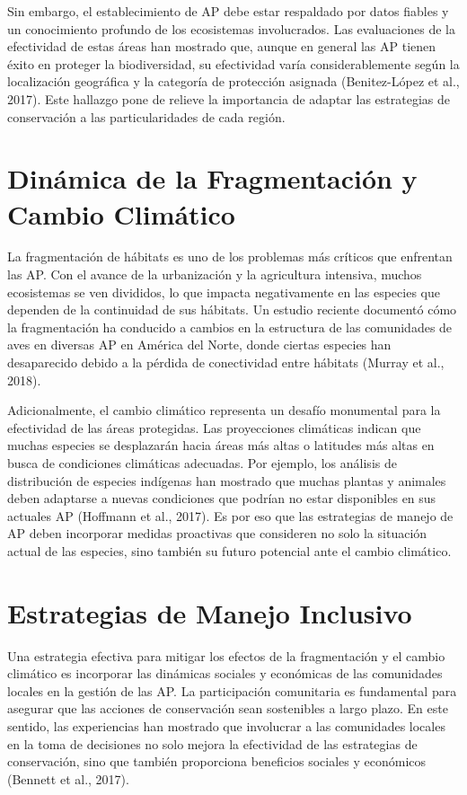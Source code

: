 \documentclass[
  letterpaper,
  DIV=11,
  numbers=noendperiod,
  oneside]{scrreprt}
\begin{document}
Sin embargo, el establecimiento de AP debe estar respaldado por datos
fiables y un conocimiento profundo de los ecosistemas involucrados. Las
evaluaciones de la efectividad de estas áreas han mostrado que, aunque
en general las AP tienen éxito en proteger la biodiversidad, su
efectividad varía considerablemente según la localización geográfica y
la categoría de protección asignada (Benitez-López et al., 2017). Este
hallazgo pone de relieve la importancia de adaptar las estrategias de
conservación a las particularidades de cada región.

\section{Dinámica de la Fragmentación y Cambio
Climático}\label{dinuxe1mica-de-la-fragmentaciuxf3n-y-cambio-climuxe1tico}

La fragmentación de hábitats es uno de los problemas más críticos que
enfrentan las AP. Con el avance de la urbanización y la agricultura
intensiva, muchos ecosistemas se ven divididos, lo que impacta
negativamente en las especies que dependen de la continuidad de sus
hábitats. Un estudio reciente documentó cómo la fragmentación ha
conducido a cambios en la estructura de las comunidades de aves en
diversas AP en América del Norte, donde ciertas especies han
desaparecido debido a la pérdida de conectividad entre hábitats (Murray
et al., 2018).

Adicionalmente, el cambio climático representa un desafío monumental
para la efectividad de las áreas protegidas. Las proyecciones climáticas
indican que muchas especies se desplazarán hacia áreas más altas o
latitudes más altas en busca de condiciones climáticas adecuadas. Por
ejemplo, los análisis de distribución de especies indígenas han mostrado
que muchas plantas y animales deben adaptarse a nuevas condiciones que
podrían no estar disponibles en sus actuales AP (Hoffmann et al., 2017).
Es por eso que las estrategias de manejo de AP deben incorporar medidas
proactivas que consideren no solo la situación actual de las especies,
sino también su futuro potencial ante el cambio climático.

\section{Estrategias de Manejo
Inclusivo}\label{estrategias-de-manejo-inclusivo}

Una estrategia efectiva para mitigar los efectos de la fragmentación y
el cambio climático es incorporar las dinámicas sociales y económicas de
las comunidades locales en la gestión de las AP. La participación
comunitaria es fundamental para asegurar que las acciones de
conservación sean sostenibles a largo plazo. En este sentido, las
experiencias han mostrado que involucrar a las comunidades locales en la
toma de decisiones no solo mejora la efectividad de las estrategias de
conservación, sino que también proporciona beneficios sociales y
económicos (Bennett et al., 2017).
\end{document}
